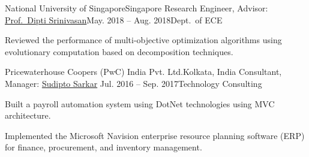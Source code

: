 \documentclass[letterpaper,10pt]{article}
\begin{document}
\item {}
\resumeItemListEnd

\resumeSubheading 
{National University of Singapore}{Singapore}
{Research Engineer, Advisor: \href{https://www.ece.nus.edu.sg/gems/profhome.html}{Prof.\ Dipti Srinivasan}}{May. 2018 -- Aug. 2018}{Dept.\ of ECE}
\resumeItemListStart
\item {Reviewed the performance of multi-objective optimization algorithms using evolutionary computation based on decomposition techniques.}
\resumeItemListEnd

\resumeSubheading
{Pricewaterhouse Coopers (PwC) India Pvt. Ltd.}{Kolkata, India}
{Consultant, Manager: \href{https://www.linkedin.com/in/sudipt0sarkar/?originalSubdomain=in}{Sudipto Sarkar}}
{Jul. 2016 -- Sep. 2017}{Technology Consulting}
\resumeItemListStart
\item {Built a payroll automation system using DotNet technologies using MVC architecture.}
\item {Implemented the Microsoft Navision enterprise resource planning software (ERP) for finance, procurement, and inventory management.}
\resumeItemListEnd
\end{document}
